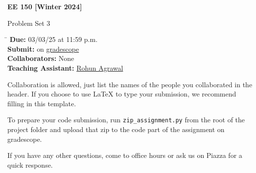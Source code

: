 


\usepackage[dvipsnames]{xcolor}



\begin{Large}
    \textsf{\textbf{EE 150 [Winter 2024]}}
    
    \textsf{Problem Set 3}
\end{Large}

\vspace{1ex}

\begin{tabbing}
    \hspace{10em} \= \kill
    \textsf{\textbf{Due:}} \> \textsf{03/03/25 at 11:59 p.m.} \\
    \textsf{\textbf{Submit:}} \> \textsf{on \href{https://gradescope.com}{gradescope}} \\
    \textsf{\textbf{Collaborators:}} \> \textsf{None} \\
    \textsf{\textbf{Teaching Assistant:}} \> \href{https://rohunagrawal.github.io}{Rohun Agrawal}
\end{tabbing}


\vspace{2ex}

Collaboration is allowed, just list the names of the people you collaborated in the header. If you choose to use \LaTeX{} to type your submission, we recommend filling in this template.

To prepare your code submission, run \verb|zip_assignment.py| from the root of the project folder and upload that zip to the code part of the assignment on gradescope.

If you have any other questions, come to office hours or ask us on Piazza for a quick response.




\newpage

